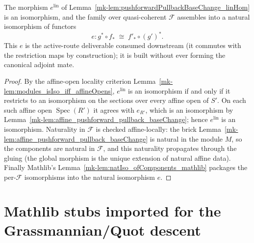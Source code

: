 \begin{lemma}
  \label{mk-lem:pushforwardPullbackBaseChange_natIso}

  The morphism \(e^{\mathrm{lin}}\) of
  Lemma~\ref{mk-lem:pushforwardPullbackBaseChange_linHom} is an isomorphism, and the
  family over quasi-coherent \(\mathcal{F}\) assembles into a natural isomorphism of
  functors
  \[
    e : g^* \circ f_* \;\cong\; f'_* \circ (g')^* .
  \]
  This \(e\) is the active-route deliverable consumed downstream (it commutes with the
  restriction maps by construction); it is built without ever forming the canonical
  adjoint mate.
\end{lemma}

\begin{proof}
  By the affine-open locality criterion
  Lemma~\ref{mk-lem:modules_isIso_iff_affineOpens}, \(e^{\mathrm{lin}}\) is an isomorphism
  if and only if it restricts to an isomorphism on the sections over every affine open
  of \(S'\). On each such affine open \(\operatorname{Spec}(R')\) it agrees with
  \(e_{R'}\), which is an isomorphism by
  Lemma~\ref{mk-lem:affine_pushforward_pullback_baseChange}; hence \(e^{\mathrm{lin}}\) is
  an isomorphism. Naturality in \(\mathcal{F}\) is checked affine-locally: the brick
  Lemma~\ref{mk-lem:affine_pushforward_pullback_baseChange} is natural in the module
  \(M\), so the components are natural in \(\mathcal{F}\), and this naturality propagates
  through the gluing (the global morphism is the unique extension of natural affine
  data). Finally Mathlib's Lemma~\ref{mk-lem:natIso_ofComponents_mathlib} packages the
  per-\(\mathcal{F}\) isomorphisms into the natural isomorphism \(e\).
\end{proof}

\section{Mathlib stubs imported for the Grassmannian/Quot descent}
\label{mk-sec:fbc_gr_union_stubs}

